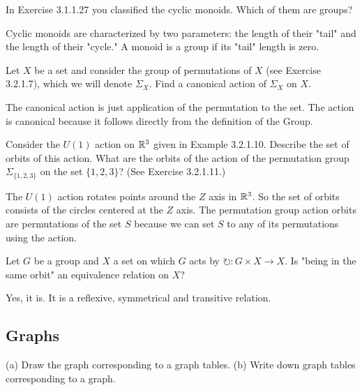 \documentclass{article}
\begin{document}
In Exercise 3.1.1.27 you classified the cyclic monoids. Which of them are groups?

\ans

Cyclic monoids are characterized by two parameters: the length of their "tail"
and the length of their "cycle." A monoid is a group if its "tail" length is
zero.


Let \( X \) be a set and consider the group of permutations of \( X \) (see
Exercise 3.2.1.7), which we will denote \(\Sigma_X\). Find a canonical action of
\(\Sigma_X\) on \( X \).

\ans

The canonical action is just application of the permutation to the set. The
action is canonical because it follows directly from the definition of the
Group.


\es Consider the \( U(1) \) action on \( \mathbb{R}^3 \) given in Example 3.2.1.10.
    Describe the set of orbits of this action.
\ei What are the orbits of the action of the permutation group
    \(\Sigma_{\{1,2,3\}}\) on the set \(\{1, 2, 3\}\)? (See Exercise 3.2.1.11.)
\ee

\ans

\es The $U(1)$ action rotates points around the $Z$ axis in $\mathbb{R}^3$. So the set
    of orbits consists of the circles centered at the $Z$ axis.
\ei The permutation group action orbits are permutations of the set $S$ because
    we can set $S$ to any of its permutations using the action.
\ee


Let \( G \) be a group and \( X \) a set on which \( G \) acts by \(
\circlearrowright : G \times X \to X \). Is "being in the same orbit" an
equivalence relation on \( X \)?

\ans

Yes, it is. It is a reflexive, symmetrical and transitive relation.

\subsection{Graphs}


(a) Draw the graph corresponding to a graph tables. (b) Write down graph tables
corresponding to a graph.

\ans

\es \ 
\end{document}
